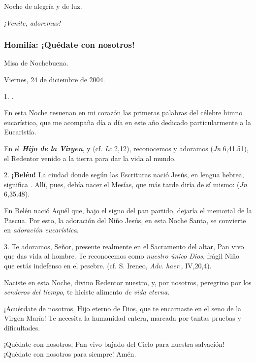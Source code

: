 Noche de alegría y de luz.

\emph{¡Venite, adoremus!}

\subsubsection{Homilía: ¡Quédate con nosotros!}

Misa de Nochebuena.

Viernes, 24 de diciembre de 2004.

1. .

En esta Noche resuenan en mi corazón las primeras palabras del célebre himno eucarístico, que me acompaña día a día en este año dedicado particularmente a la Eucaristía.

En el \emph{\textbf{Hijo de la Virgen}},  y  (cf. \emph{Lc} 2,12), reconocemos y adoramos  (\emph{Jn} 6,41.51), el Redentor venido a la tierra para dar la vida al mundo.

2. \textbf{¡Belén!} La ciudad donde según las Escrituras nació Jesús, en lengua hebrea, significa . Allí, pues, debía nacer el Mesías, que más tarde diría de sí mismo:  (\emph{Jn} 6,35.48).

En Belén nació Aquél que, bajo el signo del pan partido, dejaría el memorial de la Pascua. Por esto, la adoración del Niño Jesús, en esta Noche Santa, se convierte en \emph{adoración eucarística}.

3. Te adoramos, Señor, presente realmente en el Sacramento del altar, Pan vivo que das vida al hombre. Te reconocemos como \emph{nuestro único Dios}, frágil Niño que estás indefenso en el pesebre.  (cf. S. Ireneo, \emph{Adv. haer}., IV,20,4).

Naciste en esta Noche, divino Redentor nuestro, y, por nosotros, peregrino por los \emph{senderos del tiempo}, te hiciste alimento \emph{de vida eterna}.

¡Acuérdate de nosotros, Hijo eterno de Dios, que te encarnaste en el seno de la Virgen María! Te necesita la humanidad entera, marcada por tantas pruebas y dificultades.

¡Quédate con nosotros, Pan vivo bajado del Cielo para nuestra salvación! ¡Quédate con nosotros para siempre! Amén.

